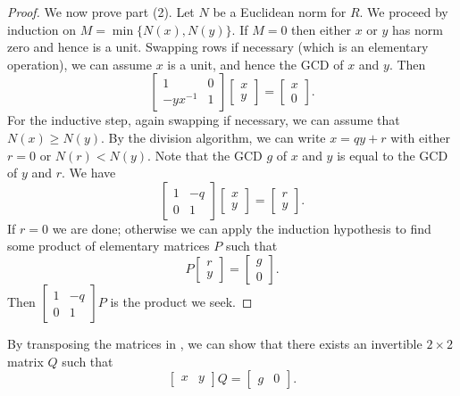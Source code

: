 \documentclass[12pt]{report}
\numberwithin{equation}{section}
\numberwithin{theorem}{chapter}
\theoremstyle{definition}
\newtheorem*{basic properties}{Basic Properties}
\newtheorem*{Important Remark}{Important Remark}
\begin{document}
\begin{proof}
	
	We now prove part (2). Let $N$ be a Euclidean norm for $R$. We proceed by induction on $M= \min\{N(x),N(y)\}$. If $M=0$ then either $x$ or $y$ has norm zero and hence is a unit. Swapping rows if necessary (which is an elementary operation), we can assume $x$ is a unit, and hence the GCD of $x$ and $y$. Then
	\[  \begin{bmatrix} 1 & 0 \\ -yx^{-1} & 1 \end{bmatrix} \begin{bmatrix} x \\ y \end{bmatrix} = \begin{bmatrix} x \\ 0 \end{bmatrix}. \]
	For the inductive step, again swapping if necessary, we can assume that $N(x)\geq N(y)$. By the division algorithm, we can write $x=qy+r$ with either $r=0$ or $N(r)<N(y)$. Note that the GCD $g$ of $x$ and $y$ is equal to the GCD of $y$ and $r$. We have
	\[  \begin{bmatrix} 1 & -q \\ 0 & 1\end{bmatrix} \begin{bmatrix} x \\ y \end{bmatrix} = \begin{bmatrix} r \\ y \end{bmatrix}. \]
If $r=0$ we are done; otherwise we can apply the induction hypothesis to find some product of elementary matrices $P$ such that 
\[ P \begin{bmatrix} r \\ y \end{bmatrix} = \begin{bmatrix} g \\ 0\end{bmatrix} . \]
Then $\begin{bmatrix} 1 & -q \\ 0 & 1\end{bmatrix}  P$ is the product we seek.
\end{proof}


By transposing the matrices in , we can show that there exists an invertible $2 \times 2$ matrix $Q$ such that
$$\begin{bmatrix} x & y\end{bmatrix} Q = \begin{bmatrix} g & 0 \end{bmatrix}.$$
\end{document}
